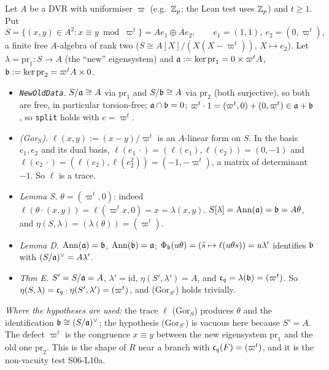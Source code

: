 \begin{example}\label{ex:s06-toy}
Let $A$ be a DVR with uniformiser $\varpi$ (e.g.\ $\mathbb{Z}_p$; the Lean test  uses $\mathbb{Z}_p$) and
$t\ge1$. Put
\[S=\{(x,y)\in A^2:x\equiv y\bmod\varpi^t\}=A e_1\oplus Ae_2,\qquad e_1=(1,1),\ e_2=(0,\varpi^t),\]
a finite free $A$-algebra of rank two ($S\cong A[X]/(X(X-\varpi^t))$, $X\mapsto e_2$). Let $\lambda=\mathrm{pr}_1:S\to A$ (the
``new'' eigensystem) and $\mathfrak{a}:=\ker\mathrm{pr}_1=0\times\varpi^tA$, $\mathfrak{b}:=\ker\mathrm{pr}_2=\varpi^tA\times0$.
\begin{itemize}
\item \emph{\texttt{NewOldData}.} $S/\mathfrak{a}\cong A$ via $\mathrm{pr}_1$ and $S/\mathfrak{b}\cong A$ via $\mathrm{pr}_2$ (both surjective), so both are
  free, in particular torsion-free; $\mathfrak{a}\cap\mathfrak{b}=0$; $\varpi^t\cdot1=(\varpi^t,0)+(0,\varpi^t)\in\mathfrak{a}+\mathfrak{b}$, so \texttt{split} holds with
  $c=\varpi^t$.
\item \emph{(Gor$_S$).} $\ell(x,y):=(x-y)/\varpi^t$ is an $A$-linear form on $S$. In the basis $e_1,e_2$ and its dual basis,
  $\ell(e_1\,\cdot)=(\ell(e_1),\ell(e_2))=(0,-1)$ and $\ell(e_2\,\cdot)=(\ell(e_2),\ell(e_2^2))=(-1,-\varpi^t)$, a matrix of determinant
  $-1$. So $\ell$ is a trace.
\item \emph{Lemma S.} $\theta=(\varpi^t,0)$: indeed $\ell(\theta\cdot(x,y))=\ell(\varpi^tx,0)=x=\lambda(x,y)$. $S[\lambda]=\operatorname{Ann}(\mathfrak{a})=\mathfrak{b}=A\theta$,
  and $\eta(S,\lambda)=(\lambda(\theta))=(\varpi^t)$.
\item \emph{Lemma D.} $\operatorname{Ann}(\mathfrak{a})=\mathfrak{b}$, $\operatorname{Ann}(\mathfrak{b})=\mathfrak{a}$; $\Phi_{\mathfrak{b}}(u\theta)=(\bar s\mapsto\ell(u\theta s))=u\lambda'$ identifies $\mathfrak{b}$ with
  $(S/\mathfrak{a})^\vee=A\lambda'$.
\item \emph{Thm E.} $S'=S/\mathfrak{a}=A$, $\lambda'=\mathrm{id}$, $\eta(S',\lambda')=A$, and $\mathfrak{c}_q=\lambda(\mathfrak{b})=(\varpi^t)$. So
  $\eta(S,\lambda)=\mathfrak{c}_q\cdot\eta(S',\lambda')=(\varpi^t)$, and (Gor$_{S'}$) holds trivially.
\end{itemize}
\emph{Where the hypotheses are used:} the trace $\ell$ (Gor$_S$) produces $\theta$ and the identification $\mathfrak{b}\cong(S/\mathfrak{a})^\vee$; the
hypothesis (Gor$_{S'}$) is vacuous here because $S'=A$. The defect $\varpi^t$ is the congruence $x\equiv y$ between the new
eigensystem $\mathrm{pr}_1$ and the old one $\mathrm{pr}_2$. This is the shape of $R$ near a branch with $\mathfrak{c}_q(F)=(\varpi^t)$, and it
is the non-vacuity test S06-L10a. \stproved{}
\end{example}

